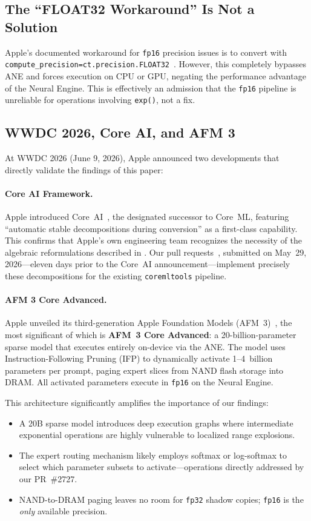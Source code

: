 \documentclass[10pt,twocolumn]{article}
\newcommand{\fp}{\texttt{fp16}}
\newcommand{\fpt}{\texttt{fp32}}
\newcommand{\ane}{ANE}
\newcommand{\coreml}{Core~ML}
\newcommand{\coremltools}{\texttt{coremltools}}
\newcommand{\expop}{\texttt{exp()}}
\begin{document}
\subsection{The ``FLOAT32 Workaround'' Is Not a Solution}

Apple's documented workaround for \fp{} precision issues is to
convert with
\texttt{compute\_precision=ct.precision.FLOAT32}~\citep{coremltools2024}.
However, this completely bypasses \ane{} and forces execution on
CPU or GPU, negating the performance advantage of the Neural
Engine.  This is effectively an admission that the \fp{} pipeline
is unreliable for operations involving \expop{}, not a fix.

\subsection{WWDC 2026, Core AI, and AFM 3}

At WWDC 2026 (June 9, 2026), Apple announced two developments that directly
validate the findings of this paper:

\paragraph{Core AI Framework.}
Apple introduced Core~AI~\citep{apple2026coreai}, the designated successor to
\coreml{}, featuring ``automatic stable decompositions during conversion'' as
a first-class capability.  This confirms that Apple's own engineering team
recognizes the necessity of the algebraic reformulations described in
.  Our pull requests~\citep{pr2725,pr2726,pr2727}, submitted
on May~29, 2026---eleven days prior to the Core~AI announcement---implement
precisely these decompositions for the existing \coremltools{} pipeline.

\paragraph{AFM 3 Core Advanced.}
Apple unveiled its third-generation Apple Foundation Models
(AFM~3)~\citep{apple2026afm3}, the most significant of which is
\textbf{AFM~3 Core Advanced}: a 20-billion-parameter sparse model that executes
entirely on-device via the \ane{}.  The model uses Instruction-Following Pruning
(IFP) to dynamically activate 1--4~billion parameters per prompt, paging expert
slices from NAND flash storage into DRAM.  All activated parameters execute in
\fp{} on the Neural Engine.

This architecture significantly amplifies the importance of our findings:
\begin{itemize}[leftmargin=*,itemsep=1pt]
  \item A 20B sparse model introduces deep execution graphs where intermediate
    exponential operations are highly vulnerable to localized range explosions.
  \item The expert routing mechanism likely employs softmax or log-softmax to
    select which parameter subsets to activate---operations directly addressed
    by our PR~\#2727.
  \item NAND-to-DRAM paging leaves no room for \fpt{} shadow copies; \fp{} is
    the \emph{only} available precision.
\end{itemize}
\end{document}
